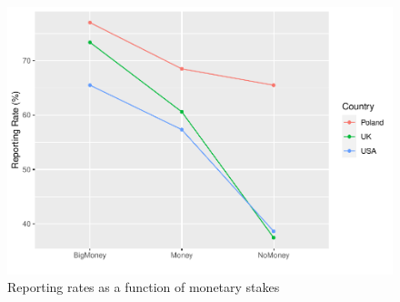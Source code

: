 \documentclass[12pt,halfline,a4paper,]{ouparticle}
\begin{document}
\begin{figure}[p]
\includegraphics[width=1\linewidth]{Civic-Honesty-Replication_files/figure-latex/Figure 2-1} \caption{Reporting rates as a function of monetary stakes}\label{fig:Figure 2-1}
\end{figure}
\end{document}
